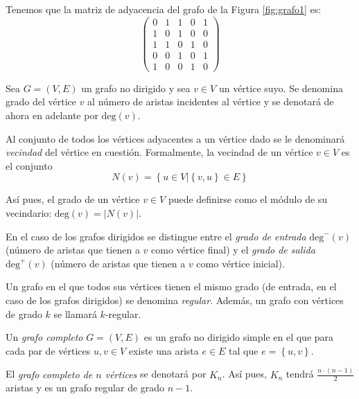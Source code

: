 \begin{exampleth}
Tenemos que la matriz de adyacencia del grafo de la Figura \ref{fig:grafo1} es:
\begin{equation}
\begin{pmatrix}
0 & 1 & 1 & 0 & 1\\
1 & 0 & 1 & 0 & 0\\
1 & 1 & 0 & 1 & 0\\
0 & 0 & 1 & 0 & 1\\
1 & 0 & 0 & 1 & 0
\end{pmatrix}
\end{equation}
\end{exampleth}

\begin{definition}\label{def:neighborhood}
Sea $G=(V,E)$ un grafo no dirigido y sea $v \in V$ un vértice suyo. Se denomina grado del vértice $v$ al número de aristas incidentes al vértice y se denotará de ahora en adelante por $\text{deg}(v)$.

Al conjunto de todos los vértices adyacentes a un vértice dado se le denominará \emph{vecindad} del vértice en cuestión. Formalmente, la vecindad de un vértice $v \in V$ es el conjunto
\begin{equation}
N(v) = \left\lbrace u \in V | \left\lbrace v,u\right\rbrace \in E \right\rbrace
\end{equation}

Así pues, el grado de un vértice $v \in V$ puede definirse como el módulo de su vecindario: $\text{deg}(v) = |N(v)|$.

En el caso de los grafos dirigidos se distingue entre el \emph{grado de entrada} $\text{deg}^-(v)$ (número de aristas que tienen a $v$ como vértice final) y el \emph{grado de salida} $\text{deg}^+(v)$ (número de aristas que tienen a $v$ como vértice inicial). 
\end{definition}


\begin{definition}
Un grafo en el que todos sus vértices tienen el mismo grado (de entrada, en el caso de los grafos dirigidos) se denomina \emph{regular}. Además, un grafo con vértices de grado $k$ se llamará $k$-regular.
\end{definition}

\begin{definition}
Un \emph{grafo completo} $G=(V,E)$ es un grafo no dirigido simple en el que para cada par de vértices $u, v\in V$ existe una arista $e \in E$ tal que $e = \left\lbrace u,v\right\rbrace$.

El \emph{grafo completo de $n$ vértices} se denotará por $K_n$. Así pues, $K_n$ tendrá $\frac{n\cdot (n-1)}{2}$ aristas y es un grafo regular de grado $n-1$.
\end{definition}

